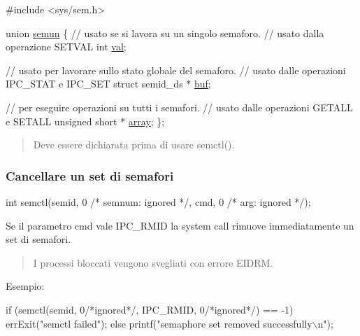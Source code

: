\begin{DoxyCode}
\textcolor{preprocessor}{#include <sys/sem.h>}

\textcolor{keyword}{union }\hyperlink{unionsemun}{semun} \{
    \textcolor{comment}{// usato se si lavora su un singolo semaforo.}
    \textcolor{comment}{// usato dalla operazione SETVAL}
    \textcolor{keywordtype}{int} \hyperlink{unionsemun_ac6121ecb6d04a024e07e12bd71b94031}{val};

    \textcolor{comment}{// usato per lavorare sullo stato globale del semaforo.}
    \textcolor{comment}{// usato dalle operazioni IPC\_STAT e IPC\_SET}
    \textcolor{keyword}{struct }semid\_ds * \hyperlink{unionsemun_ac6b6428d07d4147fd2cc698b53555bed}{buf};

    \textcolor{comment}{// per eseguire operazioni su tutti i semafori.}
    \textcolor{comment}{// usato dalle operazioni GETALL e SETALL}
    \textcolor{keywordtype}{unsigned} \textcolor{keywordtype}{short} * \hyperlink{unionsemun_aca23b8e730a0553205813c0cb7692b54}{array};
\};
\end{DoxyCode}
 \begin{quote}
Deve essere dichiarata prima di usare {\ttfamily semctl()}. \end{quote}


\subsubsection*{Cancellare un set di semafori}


\begin{DoxyCode}
\textcolor{keywordtype}{int} semctl(semid, 0 \textcolor{comment}{/* semnum: ignored */}, cmd, 0 \textcolor{comment}{/* arg: ignored */});
\end{DoxyCode}


Se il parametro {\ttfamily cmd} vale {\ttfamily I\+P\+C\+\_\+\+R\+M\+ID} la system call rimuove immediatamente un set di semafori. \begin{quote}
I processi bloccati vengono svegliati con errore {\ttfamily E\+I\+D\+RM}. \end{quote}


Esempio\+: 
\begin{DoxyCode}
\textcolor{keywordflow}{if} (semctl(semid, 0\textcolor{comment}{/*ignored*/}, IPC\_RMID, 0\textcolor{comment}{/*ignored*/}) == -1)
    errExit(\textcolor{stringliteral}{"semctl failed"});
\textcolor{keywordflow}{else}
    printf(\textcolor{stringliteral}{"semaphore set removed successfully\(\backslash\)n"});
\end{DoxyCode}


